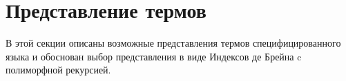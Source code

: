 \section{Представление термов}\label{term_repr}
В этой секции описаны возможные представления термов специфицированного языка и обоснован выбор представления в виде Индексов де Брейна\cite{de_brujin} c полиморфной рекурсией.






